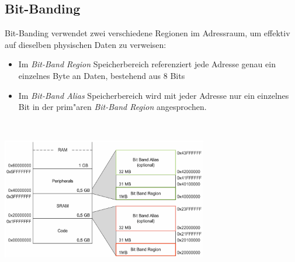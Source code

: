 \subsection{Bit-Banding}
\begin{minipage}{9cm}
	\vspace{-6ex}
	Bit-Banding verwendet zwei verschiedene Regionen im Adressraum, um effektiv auf dieselben physischen Daten zu verweisen:
	\begin{itemize}
		\item Im \textit{Bit-Band Region} Speicherbereich referenziert jede Adresse genau ein einzelnes Byte an Daten, bestehend aus 8 Bits
		\item Im \textit{Bit-Band Alias} Speicherbereich wird mit jeder Adresse nur ein einzelnes Bit in der prim"aren \textit{Bit-Band Region} angesprochen.
	\end{itemize}
\end{minipage}
%
\begin{minipage}{0.5cm}
	\-\
\end{minipage}
%
\begin{minipage}{9cm}
	\includegraphics[width=9cm]{images/Bit-Banding}
\end{minipage}


